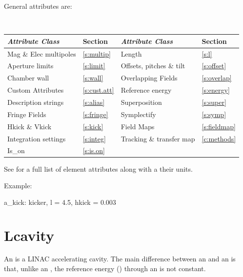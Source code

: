 General  attributes are:
\begin{center}
\tt
\begin{tabular}{llll} \toprule
  {\sl Attribute Class}      & Section           & {\sl Attribute Class}      & Section          \\ \midrule
  Mag \& Elec multipoles     & \ref{s:multip}    & Length                     & \ref{s:l}        \\
  Aperture limits            & \ref{s:limit}     & Offsets, pitches \& tilt   & \ref{s:offset}   \\
  Chamber wall               & \ref{s:wall}      & Overlapping Fields         & \ref{s:overlap}  \\
  Custom Attributes          & \ref{s:cust.att}  & Reference energy           & \ref{s:energy}   \\ 
  Description strings        & \ref{s:alias}     & Superposition              & \ref{s:super}    \\
  Fringe Fields              & \ref{s:fringe}    & Symplectify                & \ref{s:symp}     \\
  Hkick \& Vkick             & \ref{s:kick}      & Field Maps                 & \ref{s:fieldmap} \\
  Integration settings       & \ref{s:integ}     & Tracking \& transfer map   & \ref{c:methods}  \\ 
  Is_on                      & \ref{s:is.on}     &                            &                  \\
  \bottomrule
\end{tabular}
\end{center}
\toffset
See  for a full list of element attributes along with a their units.

Example:
\begin{example}
  a_kick: kicker, l = 4.5, hkick = 0.003
\end{example}

\newpage

\section{Lcavity}
\label{s:lcav}

An  is a LINAC accelerating cavity.  The main difference between an  and an
 is that, unlike an , the reference energy () through
an  is not constant.

